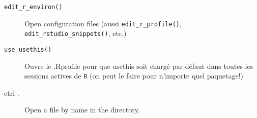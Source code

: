 \documentclass[10pt, french]{article}
\begin{document}
\begin{multicols*}{2}
\begin{distributions}[usethis]
\begin{description}
	\item[\texttt{edit_r_environ()}]	Open configuration files (aussi \texttt{edit_r_profile()}, \texttt{edit_rstudio_snippets()}, etc.)
	\item[\texttt{use_usethis()}]	Ouvre le .Rprofile pour que usethis soit chargé par défaut dans toutes les sessions actives de \texttt{R} (on peut le faire pour n'importe quel paquetage!)
\end{description}
\end{distributions}


\begin{algo}
\begin{description}
	\item[ctrl-.]	Open a file by name in the directory.
\end{description}
\end{algo}


\end{multicols*}
\end{document}
